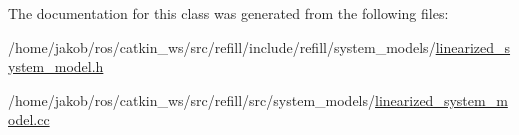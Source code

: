The documentation for this class was generated from the following files\+:\begin{DoxyCompactItemize}
\item 
/home/jakob/ros/catkin\+\_\+ws/src/refill/include/refill/system\+\_\+models/\hyperlink{linearized__system__model_8h}{linearized\+\_\+system\+\_\+model.\+h}\item 
/home/jakob/ros/catkin\+\_\+ws/src/refill/src/system\+\_\+models/\hyperlink{linearized__system__model_8cc}{linearized\+\_\+system\+\_\+model.\+cc}\end{DoxyCompactItemize}
